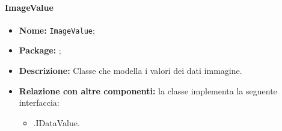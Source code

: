 \paragraph{ImageValue}
\begin{itemize}
\item \textbf{Nome:} \texttt{ImageValue};
\item \textbf{Package:} \texttt{\smodel{}};
\item \textbf{Descrizione:} Classe che modella i valori dei dati immagine.
\item \textbf{Relazione con altre componenti:} la classe implementa la seguente interfaccia:
		\begin{itemize}
			\item \smodel{}.IDataValue.
		\end{itemize}
\end{itemize}
